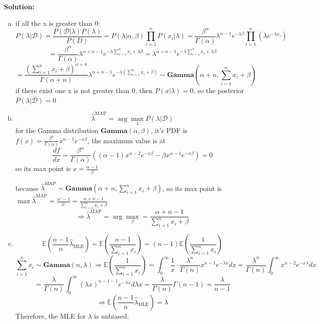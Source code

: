 \documentclass[10pt]{article}
\begin{document}
\begin{enumerate}[1.]
		
		\textbf{Solution:}
		\begin{enumerate}[(a)]
			\item 
			if all the x is greater than 0:
			$$P(\lambda|\mathcal{D})=\frac{P(\mathcal{D}|\lambda)P(\lambda)}{P(D)}=P(\lambda|\alpha,\beta)\prod_{i=1}^nP(x_i|\lambda)=\frac{\beta^\alpha}{\Gamma(\alpha)}\lambda^{\alpha-1}e^{-\lambda\beta}\prod_{i=1}^{n}(\lambda e^{-\lambda x_i})$$
			$$=\frac{\beta^\alpha}{\Gamma(\alpha)}\lambda^{\alpha+n-1} e^{-\lambda\sum_{i=1}^{n}x_i+\lambda\beta}=\lambda^{\alpha+n-1}e^{-\lambda\sum_{i=1}^nx_i+\lambda\beta}$$
			$$=\frac{(\sum_{i=1}^nx_i+\beta)^{\alpha+n}}{\Gamma(\alpha+n)}\lambda^{\alpha+n-1}e^{-\lambda(\sum_{i=1}^nx_i+\beta)}\sim \mathbf{Gamma}(\alpha+n,\sum_{i=1}^nx_i+\beta)$$
			if there exist one x is not greater than 0, then $P(x|\lambda)=0$, so the posterior $P(\lambda|\mathcal{D})=0$
			\item
			$$\hat\lambda^{\text{MAP}}=\arg\max_{\lambda}P(\lambda|\mathcal{D})$$
			for the Gamma distribution $\mathbf{Gamma}(\alpha,\beta)$, it's PDF is $f(x)=\frac{\beta^\alpha}{\Gamma(\alpha)}x^{\alpha-1}e^{-x\beta}$, the maximum value is at $$\frac{df}{dx}=\frac{\beta^\alpha}{\Gamma(\alpha)}((\alpha-1)x^{\alpha-2}e^{-x\beta}-\beta x^{\alpha-1}e^{-x\beta})=0$$ 
			so its max point is $x=\frac{\alpha-1}{\beta}$ 

			because $\hat\lambda^{\text{MAP}}\sim\mathbf{Gamma}(\alpha+n,\sum_{i=1}^nx_i+\beta)$, so its max point is $\max\hat\lambda^{\text{MAP}}=\frac{\alpha'-1}{\beta'}=\frac{\alpha+n-1}{\sum_{i=1}^nx_i+\beta}$
			$$\Rightarrow\hat\lambda^{\text{MAP}}=\arg\max_{\beta}=\frac{\alpha+n-1}{\sum_{i=1}^{n}x_i+\beta}$$
			\item 
			$$\mathbb{E}(\frac{n-1}{n}\hat\lambda_{\text{MLE}})=\mathbb{E}(\frac{n-1}{\sum_{i=1}^nx_i})=(n-1)\mathbb{E}(\frac{1}{\sum_{i=1}^nx_i})$$
			$$\sum_{i=1}^nx_i\sim\mathbf{Gamma}(n,\lambda)\Rightarrow\mathbb{E}(\frac1{\sum_{i=1}^nx_i})=\int_{0}^{\infty}\frac{1}{x}\cdot\frac{\lambda^n}{\Gamma(n)}x^{n-1}e^{-\lambda x}dx=\frac{\lambda^n}{\Gamma(n)}\int_{0}^{\infty}x^{n-2}e^{-x\lambda}dx$$
			$$=\frac{\lambda}{\Gamma(n)}\int_{0}^{\infty}(\lambda x)^{n-1-1}e^{-\lambda x}d\lambda x=\frac{\lambda}{\Gamma(n)}\Gamma(n-1)=\frac{\lambda}{n-1}$$
			$$\Rightarrow\mathbb{E}(\frac{n-1}{n}\hat\lambda_{\text{MLE}})=\lambda$$
			Therefore, the MLE for $\lambda$ is unbiased.
		\end{enumerate}
		\newpage


\end{enumerate}
\end{document}
